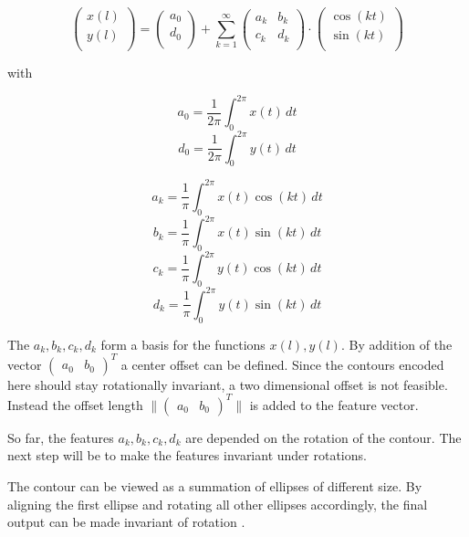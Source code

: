 $$
\begin{pmatrix}
  x(l) \\
  y(l) \\
\end{pmatrix}
=
\begin{pmatrix}
  a_0 \\
  d_0 \\
\end{pmatrix}
+
\sum_{k=1}^\infty 
\begin{pmatrix}
  a_k & b_k\\
  c_k & d_k\\
\end{pmatrix}
\cdot
\begin{pmatrix}
  \cos(kt)\\
  \sin(kt)\\
\end{pmatrix}
$$

with

$$
a_0 = \frac{1}{2\pi} \int_{0}^{2 \pi}  x(t) \,dt 
$$
$$
d_0 = \frac{1}{2\pi} \int_{0}^{2 \pi}  y(t) \,dt 
$$

$$
a_k = \frac{1}{\pi} \int_{0}^{2 \pi}  x(t) \cos(kt) \,dt 
$$
$$
b_k = \frac{1}{\pi} \int_{0}^{2 \pi}  x(t) \sin(kt) \,dt 
$$
$$
c_k = \frac{1}{\pi} \int_{0}^{2 \pi}  y(t) \cos(kt) \,dt 
$$
$$
d_k = \frac{1}{\pi} \int_{0}^{2 \pi}  y(t) \sin(kt )\,dt 
$$

The $a_k, b_k, c_k, d_k$ form a basis for the functions $x(l), y(l)$.
By addition of the vector $ \begin{pmatrix} a_0 & b_0 \end{pmatrix}^T $ a center offset can be defined.
Since the contours encoded here should stay rotationally invariant, a two dimensional offset is not feasible.
Instead the offset length $\|  \begin{pmatrix} a_0 & b_0 \end{pmatrix}^T \| $ is added to the feature vector.

So far, the features $a_k, b_k, c_k, d_k$ are depended on the rotation of the contour.
The next step will be to make the features invariant under rotations.

The contour can be viewed as a summation of ellipses of different size.
By aligning the first ellipse and rotating all other ellipses accordingly, the final output can be made invariant
of rotation \cite{MEBA}.


